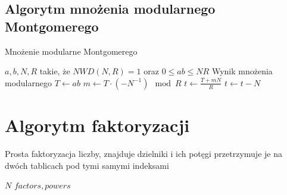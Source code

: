 \documentclass{article}
\begin{document}
\subsection{Algorytm mnożenia modularnego Montgomerego}
\begin{algorithm}[H]
\caption{Mnożenie modularne Montgomerego}
\renewcommand{\algorithmicrequire}{\textbf{Wejście:}}
\renewcommand{\algorithmicensure}{\textbf{Wyjście:}}
\begin{algorithmic}[1]
    \REQUIRE $a,b,N,R$ takie, że $NWD(N,R) = 1$ oraz $0 \leq ab \leq NR$
    \ENSURE  Wynik mnożenia modularnego
    \STATE $T \gets ab$
    \STATE $m \gets T \cdot (-N^{-1}) \mod R$
    \STATE $t\gets \frac{T+mN}{R}$
        \STATE $t \gets t - N$
        \ENDIF
\end{algorithmic}
\end{algorithm}
\section{Algorytm faktoryzacji}
Prosta faktoryzacja liczby, znajduje dzielniki i ich potęgi przetrzymuje je na dwóch tablicach pod tymi samymi indeksami
\begin{algorithm}[H]
\renewcommand{\algorithmicrequire}{\textbf{Wejście:}}
\renewcommand{\algorithmicensure}{\textbf{Wyjście:}}
\begin{algorithmic}[1]
    \REQUIRE $N$
    \ENSURE  $factors,powers$
        \ENDIF
    \ENDFOR
    \ENDIF
    \ENDIF
\ENDWHILE
{}
\end{algorithmic}
\end{algorithm}
\newpage
\end{document}
